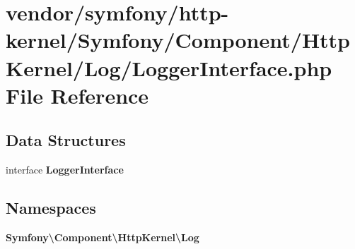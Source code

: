 \section{vendor/symfony/http-\/kernel/\+Symfony/\+Component/\+Http\+Kernel/\+Log/\+Logger\+Interface.php File Reference}
\label{symfony_2http-kernel_2_symfony_2_component_2_http_kernel_2_log_2_logger_interface_8php}
\subsection*{Data Structures}
\begin{DoxyCompactItemize}
\item 
interface {\bf Logger\+Interface}
\end{DoxyCompactItemize}
\subsection*{Namespaces}
\begin{DoxyCompactItemize}
\item 
 {\bf Symfony\textbackslash{}\+Component\textbackslash{}\+Http\+Kernel\textbackslash{}\+Log}
\end{DoxyCompactItemize}
